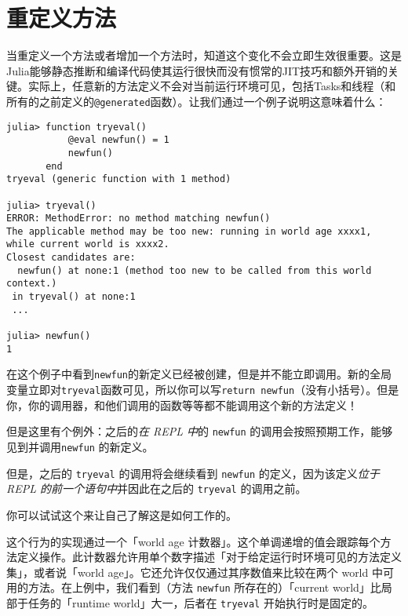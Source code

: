\hypertarget{18141577506112006209}{}


\section{重定义方法}



当重定义一个方法或者增加一个方法时，知道这个变化不会立即生效很重要。这是Julia能够静态推断和编译代码使其运行很快而没有惯常的JIT技巧和额外开销的关键。实际上，任意新的方法定义不会对当前运行环境可见，包括Tasks和线程（和所有的之前定义的\texttt{@generated}函数）。让我们通过一个例子说明这意味着什么：




\begin{verbatim}
julia> function tryeval()
           @eval newfun() = 1
           newfun()
       end
tryeval (generic function with 1 method)

julia> tryeval()
ERROR: MethodError: no method matching newfun()
The applicable method may be too new: running in world age xxxx1, while current world is xxxx2.
Closest candidates are:
  newfun() at none:1 (method too new to be called from this world context.)
 in tryeval() at none:1
 ...

julia> newfun()
1
\end{verbatim}



在这个例子中看到\texttt{newfun}的新定义已经被创建，但是并不能立即调用。新的全局变量立即对\texttt{tryeval}函数可见，所以你可以写\texttt{return newfun}（没有小括号）。但是你，你的调用器，和他们调用的函数等等都不能调用这个新的方法定义！



但是这里有个例外：之后的\emph{在 REPL 中}的 \texttt{newfun} 的调用会按照预期工作，能够见到并调用\texttt{newfun} 的新定义。



但是，之后的 \texttt{tryeval} 的调用将会继续看到 \texttt{newfun} 的定义，因为该定义\emph{位于 REPL 的前一个语句中}并因此在之后的 \texttt{tryeval} 的调用之前。



你可以试试这个来让自己了解这是如何工作的。



这个行为的实现通过一个「world age 计数器」。这个单调递增的值会跟踪每个方法定义操作。此计数器允许用单个数字描述「对于给定运行时环境可见的方法定义集」，或者说「world age」。它还允许仅仅通过其序数值来比较在两个 world 中可用的方法。在上例中，我们看到（方法 \texttt{newfun} 所存在的）「current world」比局部于任务的「runtime world」大一，后者在 \texttt{tryeval} 开始执行时是固定的。



